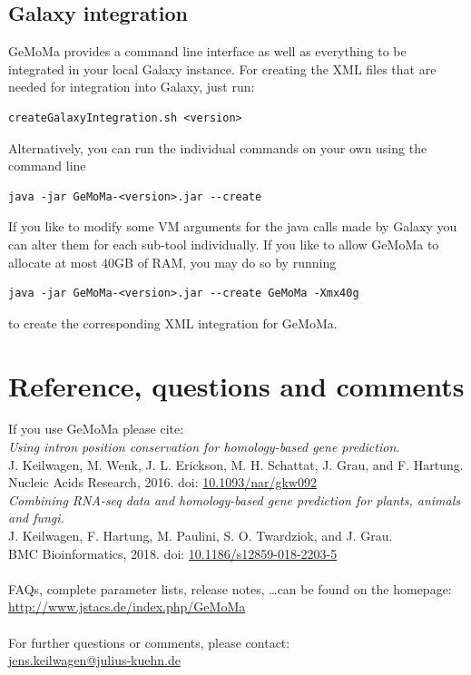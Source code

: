 \documentclass{article}
\begin{document}
\subsection{Galaxy integration}
GeMoMa provides a command line interface as well as everything to be integrated in your local Galaxy instance. For creating the XML files that are needed for integration into Galaxy, just run: 
\begin{verbatim}
createGalaxyIntegration.sh <version>
\end{verbatim}

Alternatively, you can run the individual commands on your own using the command line
\begin{verbatim}
java -jar GeMoMa-<version>.jar --create
\end{verbatim}
If you like to modify some VM arguments for the java calls made by Galaxy you can alter them for each sub-tool individually. If you like to allow GeMoMa to allocate at most 40GB of RAM, you may do so by running
\begin{verbatim}
java -jar GeMoMa-<version>.jar --create GeMoMa -Xmx40g
\end{verbatim}
to create the corresponding XML integration for GeMoMa.

\section{Reference, questions and comments}
If you use GeMoMa please cite:\\[\medskipamount]
\emph{Using intron position conservation for homology-based gene prediction.}\\
J. Keilwagen, M. Wenk, J. L. Erickson, M. H. Schattat, J. Grau, and F. Hartung.\\
Nucleic Acids Research, 2016. doi: \href{https://doi.org/10.1093/nar/gkw092}{10.1093/nar/gkw092}\\[\medskipamount]
\emph{Combining RNA-seq data and homology-based gene prediction for plants, animals and fungi.}\\
J. Keilwagen, F. Hartung, M. Paulini, S. O. Twardziok, and J. Grau.\\
BMC Bioinformatics, 2018. doi: \href{https://doi.org/10.1186/s12859-018-2203-5}{10.1186/s12859-018-2203-5}\\
~\\
FAQs, complete parameter lists, release notes, \ldots can be found on the homepage: 
\url{http://www.jstacs.de/index.php/GeMoMa}\\
~\\
For further questions or comments, please contact:\\
\href{mailto:jens.keilwagen@julius-kuehn.de?subject=GeMoMa manual}{jens.keilwagen@julius-kuehn.de}
\end{document}
